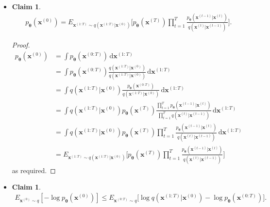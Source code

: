 \documentclass[10pt]{article}
\newtheorem{claim}[lemma]{Claim}
\newcommand{\dee}{\mathrm{d}}
\newcommand{\ve}[1]{\mathbf{#1}}
\newcommand{\ves}[1]{\boldsymbol{#1}}
\begin{document}
\begin{itemize}
  \item \begin{claim} \label{ddpm-backward-process-probability-rewrite}
  \begin{align*}
  p_{\ves{\theta}}(\ve{x}^{(0)}) = E_{\ve{x}^{(1:T)} \sim q(\ve{x}^{(1:T)}|\ve{x}^{(0)})} \bigg[ p_{\ves{\theta}}(\ve{x}^{(T)}) \prod_{t=1}^T \frac{ p_{\ves{\theta}}(\ve{x}^{(t-1)}|\ve{x}^{(t)})}{ q(\ve{x}^{(t)}|\ve{x}^{(t-1)})} \bigg].
  \end{align*}
\end{claim}

\begin{proof}
  \begin{align*}
    p_{\ves{\theta}}(\ve{x}^{(0)}) 
    &= \int p_{\ves{\theta}}(\ve{x}^{(0:T) })\, \dee\ve{x}^{(1:T)} \\
    &= \int p_{\ves{\theta}}(\ve{x}^{(0:T) }) \frac{q(\ve{x}^{(1:T)}|\ve{x}^{(0)})}{q(\ve{x}^{(1:T)}|\ve{x}^{(0)})}\, \dee\ve{x}^{(1:T)} \\
    &= \int q(\ve{x}^{(1:T)}|\ve{x}^{(0)}) \frac{p_{\ves{\theta}}(\ve{x}^{(0:T) })}{q(\ve{x}^{(1:T)}|\ve{x}^{(0)})}\, \dee\ve{x}^{(1:T)}\\
    &= \int q(\ve{x}^{(1:T)}|\ve{x}^{(0)}) p_{\ves{\theta}}(\ve{x}^{(T)}) \frac{\prod_{t=1}^T p_{\ves{\theta}}(\ve{x}^{(t-1)}|\ve{x}^{(t)})}{\prod_{t=1}^T q(\ve{x}^{(t)}|\ve{x}^{(t-1)})}\, \dee\ve{x}^{(1:T)}\\
    &= \int q(\ve{x}^{(1:T)}|\ve{x}^{(0)}) p_{\ves{\theta}}(\ve{x}^{(T)}) \prod_{t=1}^T \frac{ p_{\ves{\theta}}(\ve{x}^{(t-1)}|\ve{x}^{(t)})}{ q(\ve{x}^{(t)}|\ve{x}^{(t-1)})}\, \dee\ve{x}^{(1:T)} \\
    &= E_{\ve{x}^{(1:T)} \sim q(\ve{x}^{(1:T)}|\ve{x}^{(0)})} \bigg[ p_{\ves{\theta}}(\ve{x}^{(T)}) \prod_{t=1}^T \frac{ p_{\ves{\theta}}(\ve{x}^{(t-1)}|\ve{x}^{(t)})}{ q(\ve{x}^{(t)}|\ve{x}^{(t-1)})} \bigg]
  \end{align*}
  as required.
\end{proof}

\item \begin{claim} \label{ddpm-vlb-claim}
\begin{align*}
  E_{\ve{x}^{(0)} \sim q} [-\log p_{\ves{\theta}}(\ve{x}^{(0)})] \leq E_{\ve{x}^{(0:T)} \sim q}\Big[ \log q(\ve{x}^{(1:T)}|\ve{x}^{(0)}) - \log p_{\ves{\theta}}(\ve{x}^{(0:T)}) \Big].
\end{align*}
\end{claim}


\end{itemize}
\end{document}
